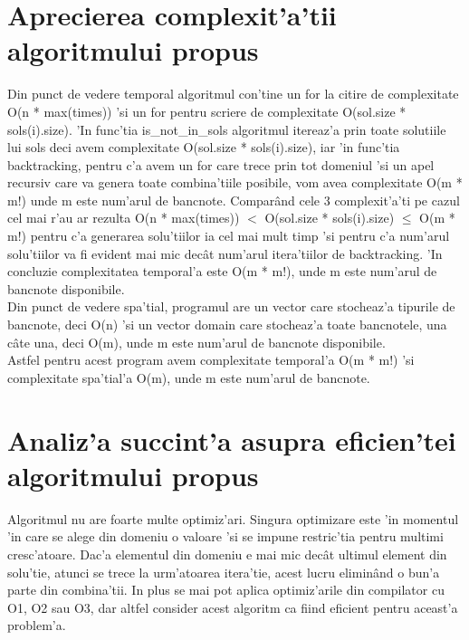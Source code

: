 \section{Aprecierea complexit'a'tii algoritmului propus}
\myindent
Din punct de vedere temporal algoritmul con'tine un for la citire de complexitate O(n * max(times)) 'si un for pentru scriere de complexitate O(sol.size * sols(i).size). 'In func'tia is\_not\_in\_sols algoritmul itereaz'a prin toate solutiile lui sols deci avem complexitate O(sol.size * sols(i).size), iar 'in func'tia backtracking, pentru c'a avem un for care trece prin tot domeniul 'si un apel recursiv care va genera toate combina'tiile posibile, vom avea complexitate O(m *  m!) unde m este num'arul de bancnote. Compar\^and cele 3 complexit'a'ti pe cazul cel mai r'au ar rezulta O(n * max(times)) $<$ O(sol.size * sols(i).size) $\le$  O(m * m!) pentru c'a generarea solu'tiilor ia cel mai mult timp 'si pentru c'a num'arul solu'tiilor va fi evident mai mic dec\^at num'arul itera'tiilor de backtracking. 'In concluzie complexitatea temporal'a este O(m *  m!), unde m este num'arul de bancnote disponibile.\\
\newline
Din punct de vedere spa'tial, programul are un vector care stocheaz'a tipurile de bancnote, deci O(n) 'si un vector domain care stocheaz'a toate bancnotele, una c\^ate una, deci O(m), unde m este num'arul de bancnote disponibile.\\
\newline
Astfel pentru acest program avem complexitate temporal'a O(m * m!) 'si complexitate spa'tial'a O(m), unde m este num'arul de bancnote. 

\vspace{10mm}
\section{Analiz'a succint'a asupra eficien'tei algoritmului propus}
\myindent
Algoritmul nu are foarte multe optimiz'ari. Singura optimizare este 'in momentul 'in care se alege din domeniu o valoare 'si se impune restric'tia pentru multimi cresc'atoare. Dac'a elementul din domeniu e mai mic dec\^at ultimul element din solu'tie, atunci se trece la urm'atoarea itera'tie, acest lucru elimin\^and o bun'a parte din combina'tii. In plus se mai pot aplica optimiz'arile din compilator cu O1, O2 sau O3, dar altfel consider acest algoritm ca fiind eficient pentru aceast'a problem'a.

\vspace{10mm}
